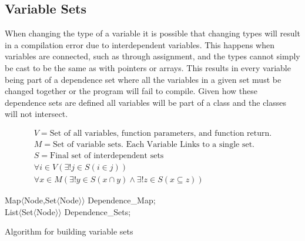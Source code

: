 \documentclass[natbib]{article}
\begin{document}
\subsection{Variable Sets}
When changing the type of a variable it is possible that changing types will result in a 
compilation error due to interdependent variables. This happens when variables are connected, 
such as through assignment, and the types cannot simply be cast to be the same as with pointers 
or arrays. This results in every variable being part of a dependence set where all the variables 
in a given set must be changed together or the program will fail to compile. Given how these 
dependence sets are defined all variables will be part of a class and the classes will not intersect.

\begin{gather} 
V = \text{Set of all variables, function parameters, and function return.}\\
M = \text{Set of variable sets. Each Variable Links to a single set.}\\
S = \text{Final set of interdependent sets}\\
\forall i \in V(\exists! j \in S(i \in j))\\
\forall x \in M(\exists! y \in S(x \cap y) \wedge \exists! z \in S(x \subseteq z))
\end{gather}

\begin{algorithm}[H]
\label{variableSetAlgo}
\SetAlgoLined
{}
Map$\langle$Node,Set$\langle$Node$\rangle\rangle$ Dependence\_Map;\\
List$\langle$Set$\langle$Node$\rangle\rangle$ Dependence\_Sets;\\
 \caption{Algorithm for building variable sets}
\end{algorithm}



\end{document}
